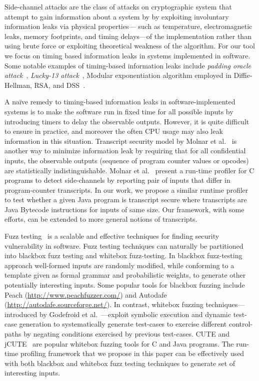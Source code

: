 Side-channel attacks are the class of attacks on cryptographic system that
attempt to gain information about a system by by exploiting involuntary
information leaks via physical properties---
such as temperature, electromagnetic leaks, memory footprints, and timing
delays---of the implementation rather than using brute force or exploiting
theoretical weakness of the algorithm.
For our tool we focus on timing based information leaks in systems
implemented in software. 
Some notable examples of timing-based information leaks include \emph{padding oracle
attack}~\cite{Vau02}, \emph{Lucky-13 attack}~\cite{al2013lucky},  Modular
exponentiation algorithm employed in Diffie-Hellman, RSA, and
DSS~\cite{kocher96}.

A na\"ive remedy to timing-based information leaks in software-implemented
systems is to make the software run in fixed time for all possible inputs by
introducing timers to delay the observable outputs. 
However, it is quite difficult to ensure in practice, and moreover the often CPU
usage may also leak information in this situation. 
Transcript security model by Molnar et al.~\cite{Molnar05} is another way
to minimize information leak by requiring that for all confidential inputs, the
observable outputs (sequence of program counter values or opcodes) are
statistically indistinguishable.
Molnar et al.~\cite{Molnar05} present a run-time profiler for C programs to
detect side-channels by reporting pair of inputs that differ in program-counter
transcripts.  
In our work, we propose a similar runtime profiler to test whether a given
Java program is transcript secure where transcripts are Java Bytecode
instructions for inputs of same size.
Our framework, with some efforts, can be extended to more general notions of
transcripts. 

Fuzz testing~\cite{God12} is a scalable and effective techniques for finding security
vulnerability in software.
Fuzz testing techniques can naturally be partitioned into blackbox fuzz testing 
and whitebox fuzz-testing. 
In blackbox fuzz-testing approach well-formed inputs are randomly modified,
while conforming to a template given as formal grammar and probabilistic
weights, to generate other potentially interesting inputs.  
Some popular tools for blackbox fuzzing include Peach 
(\url{http://www.peachfuzzer.com/}) and Autodafe
(\url{http://autodafe.sourceforge.net/}).
In contrast, whitebox fuzzing techniques---introduced by Godefroid et
al.~\cite{God12,GKS05}---exploit symbolic execution and dynamic test-case generation
to systematically generate test-cases to exercise different control-paths by
negating conditions exercised by previous test-cases.
CUTE and jCUTE~\cite{Sen2006} are popular whitebox fuzzing tools for C and Java
programs. 
The run-time profiling framework that we propose in this paper can be
effectively used with both blackbox and whitebox fuzz testing techniques to
generate set of interesting inputs.



